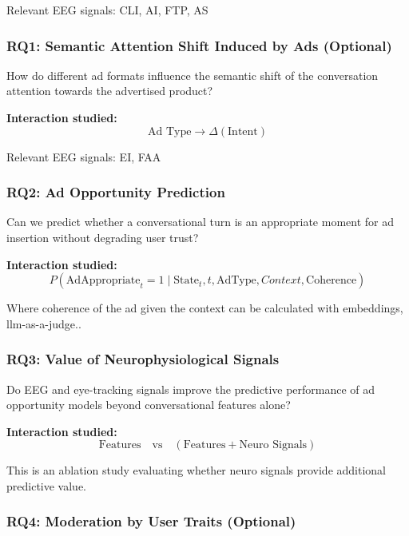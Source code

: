 \documentclass{article}
\begin{document}
Relevant EEG signals: CLI, AI, FTP, AS

\subsubsection{RQ1: Semantic Attention Shift Induced by Ads  (Optional)}
\label{RQ1}

How do different ad formats influence the semantic shift of the conversation attention towards the advertised product?

\vspace{0.3cm}
\textbf{Interaction studied:}
\[
\text{Ad Type} \rightarrow \Delta(\text{Intent})
\]

Relevant EEG signals: EI, FAA

\subsubsection{RQ2: Ad Opportunity Prediction}
\label{RQ2}

Can we predict whether a conversational turn is an appropriate moment for ad insertion without degrading user trust?

\vspace{0.3cm}
\textbf{Interaction studied:}
\[
P(\text{AdAppropriate}_t = 1 \mid \text{State}_t, t, \text{AdType}, Context, \text{Coherence})
\]

\vspace{0.2cm}
Where coherence of the ad given the context can be calculated with embeddings, llm-as-a-judge..

\subsubsection{RQ3: Value of Neurophysiological Signals}
\label{RQ3}

Do EEG and eye-tracking signals improve the predictive performance of ad opportunity models beyond conversational features alone?

\vspace{0.3cm}
\textbf{Interaction studied:}
\[
\text{Features} \quad \text{vs} \quad (\text{Features} + \text{Neuro Signals})
\]

\vspace{0.2cm}
This is an ablation study evaluating whether neuro signals provide additional predictive value.


\subsubsection{RQ4: Moderation by User Traits (Optional)}
\label{RQ4}
\end{document}
